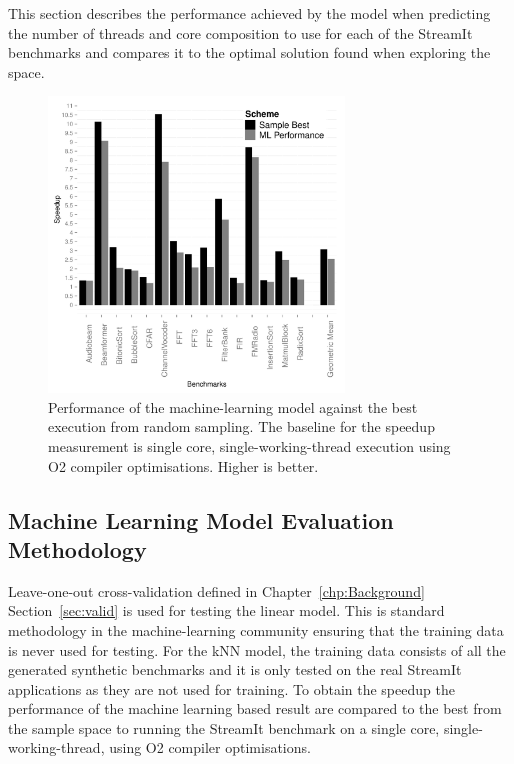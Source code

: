 This section describes the performance achieved by the model when predicting the number of threads and core composition to use for each of the StreamIt benchmarks and compares it to the optimal solution found when exploring the space.

\begin{figure}[t]
    \centering
    \includegraphics[width=0.7\textwidth]{streamit-paper/graphics/results.pdf}
    \caption{Performance of the machine-learning model against the best execution from random sampling. The baseline for the speedup measurement is single core, single-working-thread execution using O2 compiler optimisations. Higher is better.}\label{fig:results}
\end{figure}

\subsection{Machine Learning Model Evaluation Methodology}

Leave-one-out cross-validation defined in Chapter~\ref{chp:Background} Section~\ref{sec:valid} is used for testing the linear model.
This is standard methodology in the machine-learning community ensuring that the training data is never used for testing.
For the kNN model, the training data consists of all the generated synthetic benchmarks and it is only tested on the real StreamIt applications as they are not used for training.
To obtain the speedup the performance of the machine learning based result are compared to the best from the sample space to running the StreamIt benchmark on a single core, single-working-thread, using O2 compiler optimisations. 

